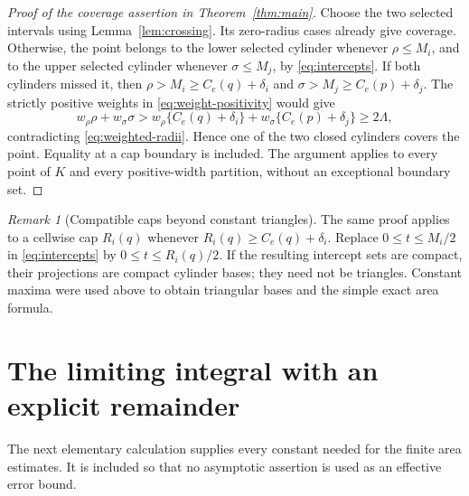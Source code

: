 \documentclass[11pt]{amsart}
\theoremstyle{definition}
\theoremstyle{remark}
\newtheorem{remark}[theorem]{Remark}
\begin{document}
\begin{proof}[Proof of the coverage assertion in Theorem~\ref{thm:main}]
Choose the two selected intervals using Lemma~\ref{lem:crossing}. Its
zero-radius cases already give coverage. Otherwise, the point belongs to
the lower selected cylinder whenever $\rho\le M_i$, and to the upper
selected cylinder whenever $\sigma\le M_j$, by
\eqref{eq:intercepts}. If both cylinders missed it, then
$\rho>M_i\ge C_e(q)+\delta_i$ and
$\sigma>M_j\ge C_e(p)+\delta_j$. The strictly positive weights
in \eqref{eq:weight-positivity} would give
\[
 w_\rho\rho+w_\sigma\sigma
 > w_\rho\{C_e(q)+\delta_i\}
  +w_\sigma\{C_e(p)+\delta_j\}\ge2\Lambda,
\]
contradicting \eqref{eq:weighted-radii}. Hence one of the two closed
cylinders covers the point. Equality at a cap boundary is included.
The argument applies to every point of $K$ and every positive-width
partition, without an exceptional boundary set.
\end{proof}

\begin{remark}[Compatible caps beyond constant triangles]\label{rem:caps}
The same proof applies to a cellwise cap $R_i(q)$ whenever
$R_i(q)\ge C_e(q)+\delta_i$. Replace $0\le t\le M_i/2$ in
\eqref{eq:intercepts} by $0\le t\le R_i(q)/2$. If the resulting
intercept sets are compact, their projections are compact cylinder bases;
they need not be triangles. Constant maxima were used above to obtain
triangular bases and the simple exact area formula.
\end{remark}

\section{The limiting integral with an explicit remainder}\label{sec:integral}

The next elementary calculation supplies every constant needed for the
finite area estimates. It is included so that no asymptotic assertion is
used as an effective error bound.
\end{document}
